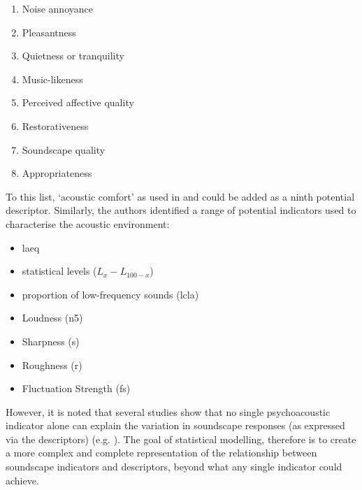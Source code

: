 \begin{enumerate}
  \item Noise annoyance
  \item Pleasantness
  \item Quietness or tranquility
  \item Music-likeness
  \item Perceived affective quality
  \item Restorativeness
  \item Soundscape quality
  \item Appropriateness
\end{enumerate}

To this list, `acoustic comfort' as used in \citet{Yang2005Acoustic} and \citet{Vardaxis2018Reviewa} could be added as a ninth potential descriptor. Similarly, the authors identified a range of potential indicators used to characterise the acoustic environment:

\begin{itemize}
  \item \gls{laeq}
  \item statistical levels ($L_x-L_{100-x}$)
  \item proportion of low-frequency sounds (\gls{lcla})
  \item Loudness (\gls{n5})
  \item Sharpness (\gls{s})
  \item Roughness (\gls{r})
  \item Fluctuation Strength (\gls{fs})
\end{itemize}

However, it is noted that several studies show that no single psychoacoustic indicator alone can explain the variation in soundscape responses (as expressed via the descriptors) (e.g. \citep{PerssonWaye2002Psycho}). The goal of statistical modelling, therefore is to create a more complex and complete representation of the relationship between soundscape indicators and descriptors, beyond what any single indicator could achieve. 

